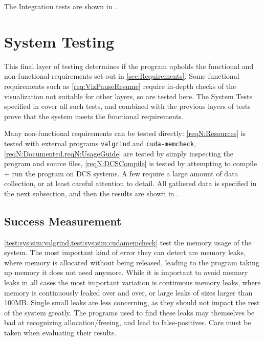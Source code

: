 The Integration tests are shown in .




\section{System Testing}
This final layer of testing determines if the program upholds the functional and non-functional requirements set out in \cref{sec:Requirements}.
Some functional requirements such as \cref{req:VizPauseResume} require in-depth checks of the visualization not suitable for other layers, so are tested here.
The System Tests specified in  cover all such tests, and combined with the previous layers of tests prove that the system meets the functional requirements.

Many non-functional requirements can be tested directly: \cref{reqN:Resources} is tested with external programs \texttt{valgrind} and \texttt{cuda-memcheck}, \cref{reqN:Documented,reqN:UsageGuide} are tested by simply inspecting the program and source files, \cref{reqN:DCSCompile} is tested by attempting to compile + run the program on DCS systems.
A few require a large amount of data collection, or at least careful attention to detail.
All gathered data is specified in the next subsection, and then the results are shown in .




\subsection{Success Measurement}
\cref{test:sys:sim:valgrind,test:sys:sim:cudamemcheck} test the memory usage of the system.
The most important kind of error they can detect are memory leaks, where memory is allocated without being released, leading to the program taking up memory it does not need anymore.
While it is important to avoid memory leaks in all cases the most important variation is continuous memory leaks, where memory is continuously leaked over and over, or large leaks of sizes larger than 100MB.
Single small leaks are less concerning, as they should not impact the rest of the system greatly.
The programs used to find these leaks may themselves be bad at recognizing allocation/freeing, and lead to false-positives.
Care must be taken when evaluating their results.

